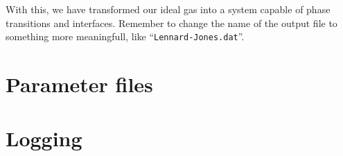 With this, we have transformed our ideal gas into a system capable of phase
transitions and interfaces. Remember to change the name of the output file to
something more meaningfull, like ``\texttt{Lennard-Jones.dat}''.

\section{Parameter files}

\section{Logging}

